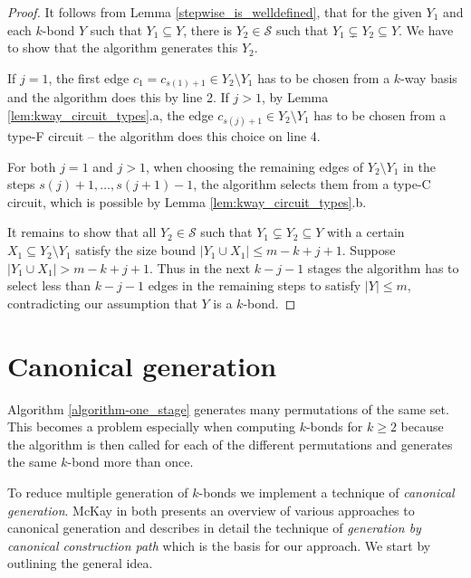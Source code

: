 \begin{proof}
	It follows from Lemma \ref{stepwise_is_welldefined}, that for the given $Y_1$ and each $k$-bond $Y$ such that $Y_1 \subseteq Y$, there is $Y_2 \in \mathcal{S}$ such that $Y_1 \subsetneq Y_2 \subseteq Y$. We have to show that the algorithm generates this $Y_2$.

	If $j = 1$, the first edge $c_1 = c_{s(1)+1} \in Y_2 \setminus Y_1$ has to be chosen from a $k$-way basis and the algorithm does this by line 2. If $j > 1$, by Lemma \ref{lem:kway_circuit_types}.a, the edge $c_{s(j)+1} \in Y_2 \setminus Y_1$ has to be chosen from a \break type-F circuit -- the algorithm does this choice on line 4.

 For both $j = 1$ and $j > 1$, when choosing the remaining edges of $Y_2 \setminus Y_1$ in the steps $s(j) + 1, \ldots, s(j+1)-1$, the algorithm selects them from a type-C circuit, which is possible by Lemma \ref{lem:kway_circuit_types}.b.


 It remains to show that all $Y_2 \in \mathcal{S}$ such that $Y_1 \subsetneq Y_2 \subseteq Y$ with a certain $X_1 \subseteq Y_2 \setminus Y_1$ satisfy the size bound $\lvert Y_1 \cup X_1 \rvert \leq m - k + j + 1$. Suppose $\lvert Y_1 \cup X_1 \rvert > m - k + j + 1$. Thus in the next $k - j - 1$ stages the algorithm has to select less than $k - j - 1$ edges in the remaining steps to satisfy $\lvert Y \rvert \leq m$, contradicting our assumption that $Y$ is a $k$-bond.
\end{proof}


\chapter{Canonical generation}
\label{ch:canonical}

Algorithm \ref{algorithm-one_stage} generates many permutations of the same set. This becomes a problem especially when computing $k$-bonds for $k \geq 2$ because the algorithm is then called for each of the different permutations and generates the same $k$-bond more than once.

To reduce multiple generation of $k$-bonds we implement a technique of \textit{canonical generation}. McKay in \cite{mckay_isom} both presents an overview of various approaches to canonical generation and describes in detail the technique of \textit{generation by canonical construction path} which is the basis for our approach. We start by outlining the general idea.


